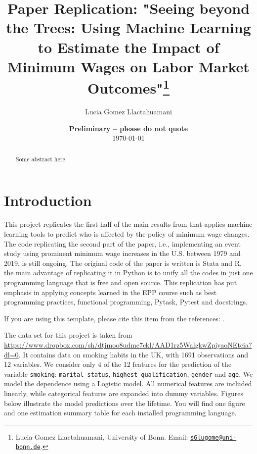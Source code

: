 \documentclass[11pt, a4paper, leqno]{article}
\begin{document}
\title{Paper Replication: "Seeing beyond the Trees: Using Machine Learning to Estimate the Impact of Minimum Wages on Labor Market Outcomes"\thanks{Lucia Gomez Llactahuamani, University of Bonn. Email: \href{mailto:s6lugome@uni-bonn.de}{\nolinkurl{s6lugome@uni-bonn.de}}.}}

\author{Lucia Gomez Llactahuamani}

\date{
    {\bf Preliminary -- please do not quote}
    \\[1ex]
    \today
}

\maketitle


\begin{abstract}
    Some abstract here.
\end{abstract}

\clearpage


\section{Introduction} %
\label{sec:introduction}

This project replicates the first half of the main results from \citet{cengiz2022seeing} that applies machine learning 
tools to predict who is affected by the policy of minimum wage changes. The code replicating the second part 
of the paper, i.e., implementing an event study using prominent minimum wage increases in the U.S. between 1979
 and 2019, is still ongoing. The original code of the paper is written is Stata and R, the main advantage of 
 replicating it in Python is to unify all the codes in just one programming language that is free and open source. 
 This replication has put emphasis in applying concepts learned in the EPP course such as best programming practices,
 functional programming, Pytask, Pytest and docstrings.


If you are using this template, please cite this item from the references:
\citet{GaudeckerEconProjectTemplates}.


The data set for this project is taken from 
\url{https://www.dropbox.com/sh/dtjmoo8udmc7ckl/AAD1rz5WalgkwZpiyaoNEtcia?dl=0}.
It contains data on smoking habits in the UK, with 1691 observations and 12 variables.
We consider only 4 of the 12 features for the prediction of the variable
\texttt{smoking}: \texttt{marital\_status}, \texttt{highest\_qualification},
\texttt{gender} and \texttt{age}. We model the dependence using a Logistic model. All
numerical features are included linearly, while categorical features are expanded into
dummy variables. Figures below illustrate the model predictions over the lifetime. You
will find one figure and one estimation summary table for each installed programming
language.
\end{document}
